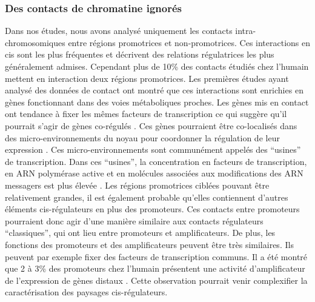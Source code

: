 \subsubsection*{Des contacts de chromatine ignorés}
Dans nos études, nous avons analysé uniquement les contacts intra-chromosomiques entre régions promotrices et non-promotrices. Ces interactions en \gls{cis} sont les plus fréquentes et décrivent des relations régulatrices les plus généralement admises. Cependant plus de 10\% des contacts étudiés chez l’humain mettent en interaction deux régions promotrices. Les premières études ayant analysé des données de contact ont montré que ces interactions sont enrichies en gènes fonctionnant dans des voies métaboliques proches. Les gènes mis en contact ont tendance à fixer les mêmes facteurs de transcription ce qui suggère qu'il pourrait s'agir de gènes co-régulés \citep{schoenfelder_pluripotent_2015}. Ces gènes pourraient être co-localisés dans des micro-environnements du noyau pour coordonner la régulation de leur expression \citep{osborne_active_2004}. Ces micro-environnements sont communément appelés des “usines” de transcription. Dans ces “usines”, la concentration en facteurs de transcription, en ARN polymérase active et en molécules associées aux modifications des ARN messagers est plus élevée \citep{sutherland_transcription_2009, rieder_transcription_2012}. Les régions promotrices ciblées pouvant être relativement grandes, il est également probable qu’elles contiennent d’autres éléments \gls{cis}-régulateurs en plus des promoteurs. Ces contacts entre promoteurs pourraient donc agir d’une manière similaire aux contacts régulateurs “classiques”, qui ont lieu entre promoteurs et amplificateurs. De plus, les fonctions des promoteurs et des \glspl{amplificateur} peuvent être très similaires. Ils peuvent par exemple fixer des facteurs de transcription communs. Il a été montré que 2 à 3\% des promoteurs chez l’humain présentent une activité d’\gls{amplificateur} de l’expression de gènes distaux \citep{dao_genome-wide_2017}. Cette observation pourrait venir complexifier la caractérisation des paysages \gls{cis}-régulateurs.\\

